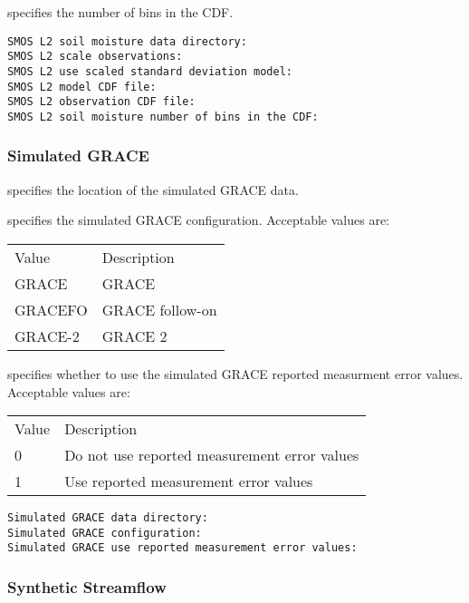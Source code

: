   specifies
 the number of bins in the CDF.
 

 \begin{Verbatim}[frame=single]
SMOS L2 soil moisture data directory:
SMOS L2 scale observations:
SMOS L2 use scaled standard deviation model:
SMOS L2 model CDF file:
SMOS L2 observation CDF file:
SMOS L2 soil moisture number of bins in the CDF:
 \end{Verbatim}
 

 
 
 \subsubsection{Simulated GRACE}
 \label{sssec:simgraceda}
 

 
  specifies the location
 of the simulated GRACE data.

  specifies the simulated GRACE
 configuration.
 Acceptable values are: 

 \begin{tabular}{ll}
 Value   & Description     \\
 GRACE   & GRACE           \\
 GRACEFO & GRACE follow-on \\
 GRACE-2 & GRACE 2         \\
 \end{tabular}

  specifies
 whether to use the simulated GRACE reported measurment error values.
 Acceptable values are:

 \begin{tabular}{ll}
 Value & Description                                  \\
 0     & Do not use reported measurement error values \\
 1     & Use reported measurement error values        \\
 \end{tabular}
 

 \begin{Verbatim}[frame=single]
Simulated GRACE data directory:
Simulated GRACE configuration:
Simulated GRACE use reported measurement error values:
 \end{Verbatim}
 

 
 
 \subsubsection{Synthetic Streamflow}
 \label{sssec:synsfda}
 

